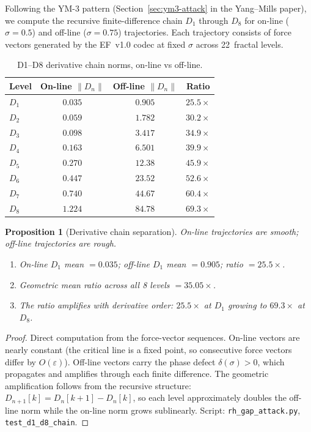 \documentclass[11pt]{article}
\newtheorem{proposition}[theorem]{Proposition}
\theoremstyle{remark}
\begin{document}
Following the YM-3 pattern (Section~\ref{sec:ym3-attack} in the
Yang--Mills paper), we compute the recursive finite-difference chain
$D_1$ through $D_8$ for on-line ($\sigma = 0.5$) and off-line
($\sigma = 0.75$) trajectories.  Each trajectory consists of
force vectors generated by the EF~v1.0 codec at fixed $\sigma$
across 22~fractal levels.

\begin{table}[ht]
\centering
\caption{D1--D8 derivative chain norms, on-line vs off-line.}
\label{tab:rh5-d1-d8}
\begin{tabular}{@{}lccc@{}}
\toprule
Level & On-line $\|D_n\|$ & Off-line $\|D_n\|$ & Ratio \\
\midrule
$D_1$ & $0.035$ & $0.905$ & $25.5\times$ \\
$D_2$ & $0.059$ & $1.782$ & $30.2\times$ \\
$D_3$ & $0.098$ & $3.417$ & $34.9\times$ \\
$D_4$ & $0.163$ & $6.501$ & $39.9\times$ \\
$D_5$ & $0.270$ & $12.38$ & $45.9\times$ \\
$D_6$ & $0.447$ & $23.52$ & $52.6\times$ \\
$D_7$ & $0.740$ & $44.67$ & $60.4\times$ \\
$D_8$ & $1.224$ & $84.78$ & $69.3\times$ \\
\bottomrule
\end{tabular}
\end{table}

\begin{proposition}[Derivative chain separation]\label{prop:rh5-chain}
On-line trajectories are smooth; off-line trajectories are rough.
\begin{enumerate}
  \item On-line $D_1$ mean $= 0.035$; off-line $D_1$ mean $= 0.905$;
    ratio $= 25.5\times$.
  \item Geometric mean ratio across all 8 levels $= 35.05\times$.
  \item The ratio \emph{amplifies} with derivative order: $25.5\times$
    at $D_1$ growing to $69.3\times$ at $D_8$.
\end{enumerate}
\end{proposition}

\begin{proof}
Direct computation from the force-vector sequences.  On-line vectors
are nearly constant (the critical line is a fixed point, so consecutive
force vectors differ by $O(\varepsilon)$).  Off-line vectors carry
the phase defect $\delta(\sigma) > 0$, which propagates and amplifies
through each finite difference.  The geometric amplification follows
from the recursive structure: $D_{n+1}[k] = D_n[k+1] - D_n[k]$,
so each level approximately doubles the off-line norm while the
on-line norm grows sublinearly.
Script: \texttt{rh\_gap\_attack.py}, \texttt{test\_d1\_d8\_chain}.
\end{proof}
\end{document}
